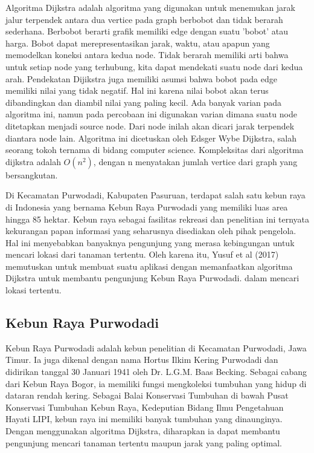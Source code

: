 \documentclass[10pt, conference]{IEEEtran}
\begin{document}
Algoritma Dijkstra adalah algoritma yang digunakan untuk menemukan jarak jalur terpendek antara dua vertice pada graph berbobot dan tidak berarah sederhana. Berbobot berarti grafik memiliki edge dengan suatu ’bobot’ atau harga. Bobot dapat merepresentasikan jarak, waktu, atau apapun yang memodelkan koneksi antara kedua node. Tidak berarah memiliki arti bahwa untuk setiap node yang terhubung, kita dapat mendekati suatu node dari kedua arah. Pendekatan Dijikstra juga memiliki asumsi bahwa bobot pada edge memiliki nilai yang tidak negatif. Hal ini karena nilai bobot akan terus dibandingkan dan diambil nilai yang paling kecil. Ada banyak varian pada algoritma ini, namun pada percobaan ini digunakan varian dimana suatu node ditetapkan menjadi source node. Dari node inilah akan dicari jarak terpendek diantara node lain. Algoritma ini dicetuskan oleh Edsger Wybe Dijkstra, salah seorang tokoh ternama di bidang computer science. Kompleksitas dari algoritma dijkstra adalah $O(n^2)$, dengan n menyatakan jumlah vertice dari graph yang
bersangkutan. 

Di Kecamatan Purwodadi, Kabupaten Pasuruan, terdapat salah satu kebun raya di Indonesia yang bernama Kebun Raya Purwodadi yang memiliki luas area hingga 85 hektar. Kebun raya sebagai fasilitas rekreasi dan penelitian ini ternyata kekurangan papan informasi yang seharusnya disediakan oleh pihak pengelola. Hal ini menyebabkan banyaknya pengunjung yang merasa kebingungan untuk mencari lokasi dari tanaman tertentu. Oleh karena itu, Yusuf et al (2017) memutuskan untuk membuat suatu aplikasi dengan memanfaatkan algoritma Dijkstra untuk membantu pengunjung Kebun Raya Purwodadi.
dalam mencari lokasi tertentu. 

\subsection{Kebun Raya Purwodadi}
Kebun Raya Purwodadi adalah kebun penelitian di Kecamatan Purwodadi, Jawa Timur. Ia juga dikenal dengan nama Hortus Ilkim Kering Purwodadi dan didirikan tanggal 30 Januari 1941 oleh Dr. L.G.M. Baas Becking. Sebagai cabang dari Kebun Raya Bogor, ia memiliki fungsi mengkoleksi tumbuhan yang hidup di dataran rendah kering. Sebagai Balai Konservasi Tumbuhan di bawah Pusat Konservasi Tumbuhan Kebun Raya, Kedeputian Bidang Ilmu Pengetahuan Hayati LIPI, kebun raya ini memiliki banyak tumbuhan yang dinaunginya. Dengan menggunakan algoritma Dijkstra, diharapkan ia dapat membantu pengunjung mencari tanaman tertentu maupun jarak
yang paling optimal. 
\end{document}
